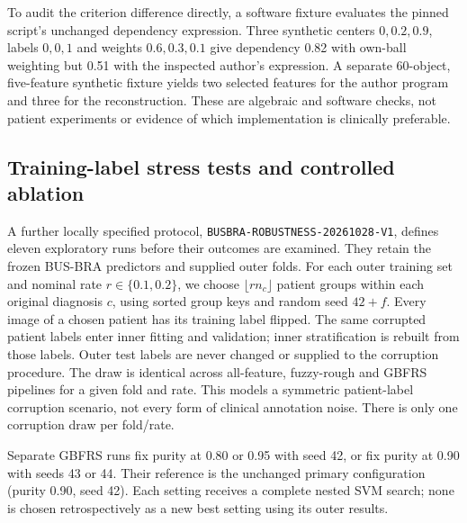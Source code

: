 \documentclass[11pt,a4paper]{article}
\begin{document}
To audit the criterion difference directly, a software fixture evaluates the pinned script's unchanged dependency expression. Three synthetic centers $0,0.2,0.9$, labels $0,0,1$ and weights $0.6,0.3,0.1$ give dependency 0.82 with own-ball weighting but 0.51 with the inspected author's expression. A separate 60-object, five-feature synthetic fixture yields two selected features for the author program and three for the reconstruction. These are algebraic and software checks, not patient experiments or evidence of which implementation is clinically preferable.


\subsection{Training-label stress tests and controlled ablation}\label{sec:robustness}
A further locally specified protocol, \texttt{BUSBRA-ROBUSTNESS-}\allowbreak\texttt{20261028-V1}, defines eleven exploratory runs before their outcomes are examined. They retain the frozen BUS-BRA predictors and supplied outer folds. For each outer training set and nominal rate $r\in\{0.1,0.2\}$, we choose $\lfloor r n_c\rfloor$ patient groups within each original diagnosis $c$, using sorted group keys and random seed $42+f$. Every image of a chosen patient has its training label flipped. The same corrupted patient labels enter inner fitting and validation; inner stratification is rebuilt from those labels. Outer test labels are never changed or supplied to the corruption procedure. The draw is identical across all-feature, fuzzy-rough and GBFRS pipelines for a given fold and rate. This models a symmetric patient-label corruption scenario, not every form of clinical annotation noise. There is only one corruption draw per fold/rate.

Separate GBFRS runs fix purity at 0.80 or 0.95 with seed 42, or fix purity at 0.90 with seeds 43 or 44. Their reference is the unchanged primary configuration (purity 0.90, seed 42). Each setting receives a complete nested SVM search; none is chosen retrospectively as a new best setting using its outer results.
\end{document}
